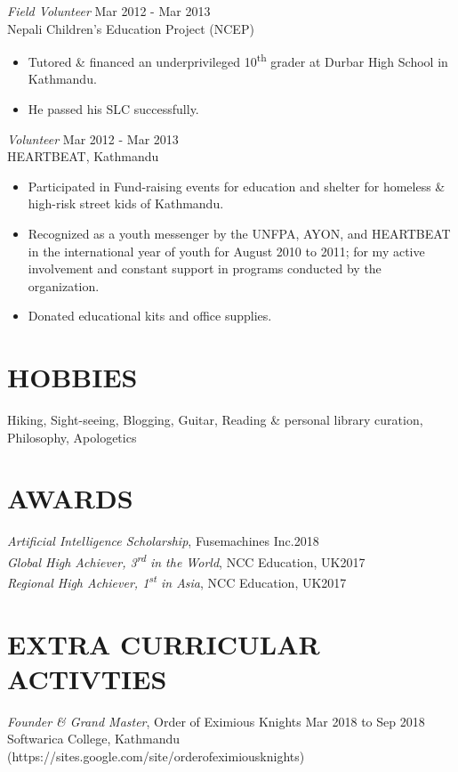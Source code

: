 \documentclass[margin, 10pt]{res}
\begin{document}
\begin{resume}
\emph{Field Volunteer} \hfill Mar 2012 - Mar 2013\\
Nepali Children's Education Project (NCEP)
\begin{itemize}
	\item Tutored \& financed an underprivileged 10\textsuperscript{th} grader at Durbar High School in Kathmandu.
	\item He passed his SLC successfully.
\end{itemize}

\emph{Volunteer} \hfill Mar 2012 - Mar 2013\\
HEARTBEAT, Kathmandu
\begin{itemize}
	\item Participated in Fund-raising events for education and shelter for homeless \& high-risk street kids of Kathmandu.
	\item Recognized as a youth messenger by the UNFPA, AYON, and HEARTBEAT in the international year of youth for August 2010 to 2011; for my active involvement and constant support in programs conducted by the organization.
	\item Donated educational kits and office supplies.
\end{itemize}

\section{HOBBIES}
Hiking, Sight-seeing, Blogging, Guitar, Reading \& personal library curation, Philosophy, Apologetics

\section{AWARDS}
\emph{Artificial Intelligence Scholarship}, Fusemachines Inc.\hfill 2018\\
\emph{Global High Achiever, 3\textsuperscript{rd} in the World}, NCC Education, UK\hfill 2017\\
\emph{Regional High Achiever, 1\textsuperscript{st} in Asia}, NCC Education, UK\hfill 2017\\

\section{EXTRA CURRICULAR\\ACTIVTIES}
\emph{Founder \& Grand Master}, Order of Eximious Knights \hfill Mar 2018 to Sep 2018\\
Softwarica College, Kathmandu\\ 
(https://sites.google.com/site/orderofeximiousknights)


\end{resume}
\end{document}
